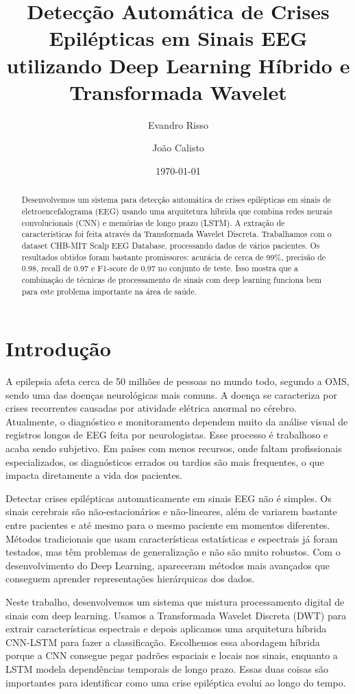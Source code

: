 \documentclass[12pt,a4paper]{article}
\title{Detecção Automática de Crises Epilépticas em Sinais EEG utilizando Deep Learning Híbrido e Transformada Wavelet}
\author{Evandro Risso \and João Calisto}
\date{\today}
\begin{document}
\maketitle

\begin{abstract}
Desenvolvemos um sistema para detecção automática de crises epilépticas em sinais de eletroencefalograma (EEG) usando uma arquitetura híbrida que combina redes neurais convolucionais (CNN) e memórias de longo prazo (LSTM). A extração de características foi feita através da Transformada Wavelet Discreta. Trabalhamos com o dataset CHB-MIT Scalp EEG Database, processando dados de vários pacientes. Os resultados obtidos foram bastante promissores: acurácia de cerca de 99\%, precisão de 0.98, recall de 0.97 e F1-score de 0.97 no conjunto de teste. Isso mostra que a combinação de técnicas de processamento de sinais com deep learning funciona bem para este problema importante na área de saúde.
\end{abstract}

\section{Introdução}

A epilepsia afeta cerca de 50 milhões de pessoas no mundo todo, segundo a OMS, sendo uma das doenças neurológicas mais comuns. A doença se caracteriza por crises recorrentes causadas por atividade elétrica anormal no cérebro. Atualmente, o diagnóstico e monitoramento dependem muito da análise visual de registros longos de EEG feita por neurologistas. Esse processo é trabalhoso e acaba sendo subjetivo. Em países com menos recursos, onde faltam profissionais especializados, os diagnósticos errados ou tardios são mais frequentes, o que impacta diretamente a vida dos pacientes.

Detectar crises epilépticas automaticamente em sinais EEG não é simples. Os sinais cerebrais são não-estacionários e não-lineares, além de variarem bastante entre pacientes e até mesmo para o mesmo paciente em momentos diferentes. Métodos tradicionais que usam características estatísticas e espectrais já foram testados, mas têm problemas de generalização e não são muito robustos. Com o desenvolvimento do Deep Learning, apareceram métodos mais avançados que conseguem aprender representações hierárquicas dos dados.

Neste trabalho, desenvolvemos um sistema que mistura processamento digital de sinais com deep learning. Usamos a Transformada Wavelet Discreta (DWT) para extrair características espectrais e depois aplicamos uma arquitetura híbrida CNN-LSTM para fazer a classificação. Escolhemos essa abordagem híbrida porque a CNN consegue pegar padrões espaciais e locais nos sinais, enquanto a LSTM modela dependências temporais de longo prazo. Essas duas coisas são importantes para identificar como uma crise epiléptica evolui ao longo do tempo.
\end{document}
